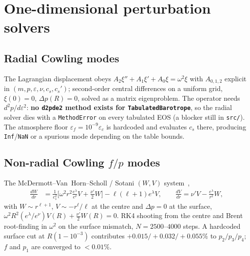 \documentclass[aps,prd,preprint,amsmath,amssymb,nofootinbib,longbibliography]{revtex4-2}
\newcommand{\cs}{c_s}
\begin{document}
\section{One-dimensional perturbation solvers}

\subsection{Radial Cowling modes}
The Lagrangian displacement obeys $A_2\xi'' + A_1\xi' + A_0\xi = \omega^2\xi$ with
$A_{0,1,2}$ explicit in $(m,p,\varepsilon,\nu,\cs,\cs')$; second-order central differences on a
uniform grid, $\xi(0)=0$, $\Delta p(R)=0$, solved as a matrix eigenproblem. The operator needs
$d^2p/d\varepsilon^2$: \textbf{no \texttt{d2pde2} method exists for \texttt{TabulatedBarotrope}},
so the radial solver dies with a \texttt{MethodError} on every tabulated EOS (a blocker still in
\texttt{src/}). The atmosphere floor $\varepsilon_f = 10^{-9}\varepsilon_c$ is hardcoded and
evaluates $\cs$ there, producing \texttt{Inf}/\texttt{NaN} or a spurious mode depending on the
table bounds.

\subsection{Non-radial Cowling $f/p$ modes}
\label{sec:fp}
The McDermott--Van~Horn--Scholl / Sotani $(W,V)$ system~\cite{Sotani2024},
\begin{align}
\frac{dW}{dr} &= \frac{1}{\cs^2}\Big[\omega^2 r^2\frac{e^{\lambda}}{e^{\nu}}V + \frac{\nu'}{2}W\Big]
 - \ell(\ell+1)e^{\lambda}V, \qquad
\frac{dV}{dr} = \nu' V - \frac{e^{\lambda}}{r^2}W,
\end{align}
with $W\sim r^{\ell+1}$, $V\sim -r^{\ell}/\ell$ at the centre and $\Delta p = 0$ at the surface,
$\omega^2R^2(e^\lambda/e^\nu)V(R) + \tfrac{\nu'}{2}W(R) = 0$. RK4 shooting from the centre and
Brent root-finding in $\omega^2$ on the surface mismatch, $N=2500$--$4000$ steps. A hardcoded
surface cut at $R(1-10^{-3})$ contributes $+0.015/+0.032/+0.055\%$ to $p_2/p_3/p_4$; $f$ and
$p_1$ are converged to $<0.01\%$.
\end{document}
